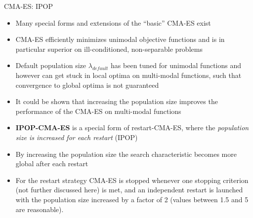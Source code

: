 \documentclass[11pt,compress,t,notes=noshow, xcolor=table]{beamer}
\begin{document}
\begin{vbframe}{CMA-ES: IPOP}
\footnotesize{
\begin{itemize}
\item Many special forms and extensions of the \enquote{basic} CMA-ES exist
\item CMA-ES efficiently minimizes unimodal objective functions and is in particular superior on ill-conditioned, non-separable problems
\item Default population size $\lambda_{default}$ has been tuned for unimodal
functions and however can get stuck in local optima on multi-modal functions, such that convergence to global optima is not guaranteed
\item It could be shown that increasing the population size improves the performance of the CMA-ES on multi-modal functions
\item \textbf{IPOP-CMA-ES} is a special form of restart-CMA-ES, where the \textit{population size is increased for each restart} (IPOP)
\item By increasing the population size the search characteristic becomes more global after each restart
\item For the restart strategy CMA-ES is stopped whenever one stopping criterion (not further discussed here) is met, and an independent restart is launched with the population size increased by a factor of 2 (values between 1.5 and 5 are reasonable).
\end{itemize}
}
\end{vbframe}
\end{document}
